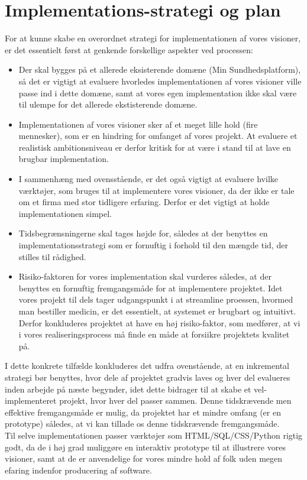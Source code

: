 \section{Implementations-strategi og plan}
For at kunne skabe en overordnet strategi for implementationen af vores visioner, er det essentielt først at genkende forskellige aspekter ved processen:
\begin{itemize}
  \item Der skal bygges på et allerede eksisterende domæne (Min Sundhedsplatform), så det er vigtigt at evaluere hvorledes implementationen af vores visioner ville passe ind
    i dette domæne, samt at vores egen implementation ikke skal være til ulempe for det allerede ekstisterende domæne. 
  \item Implementationen af vores visioner sker af et meget lille hold (fire mennesker), som er en hindring for omfanget af vores projekt. At evaluere et realistisk ambitionsniveau er derfor kritisk for at være i stand til at lave en brugbar implementation. 
  \item I sammenhæng med ovensstående, er det også vigtigt at evaluere hvilke værktøjer, som bruges til at implementere vores visioner, da der ikke er tale om et firma med stor tidligere erfaring. Derfor er det vigtigt at holde implementationen simpel.
  \item Tidsbegrænsningerne skal tages højde for, således at der benyttes en implementationsstrategi som er fornuftig i forhold til den mængde tid, der stilles til rådighed.
  \item Risiko-faktoren for vores implementation skal vurderes således, at der benyttes en fornuftig fremgangsmåde for at implementere projektet. Idet vores projekt til dels tager udgangspunkt i at streamline proessen, hvormed man bestiller medicin, er det essentielt, at systemet er brugbart og intuitivt. Derfor konkluderes projektet at have en høj risiko-faktor, som medfører, at vi i vores realiseringsprocess må finde en måde at forsiikre projektets kvalitet på.
\end{itemize}

I dette konkrete tilfælde konkluderes det udfra ovenstående, at en inkremental strategi bør benyttes, hvor dele af projektet gradvis laves og hver del evalueres inden arbejde på næste begynder, idet dette bidrager til at skabe et vel-implementeret projekt, hvor hver del passer sammen. Denne tidskrævende men effektive fremgangsmåde er mulig, da projektet har et mindre omfang (er en prototype) således, at vi kan tillade os denne tidskrævende fremgangsmåde.\\
Til selve implementationen passer værktøjer som HTML/SQL/CSS/Python rigtig godt, da de i høj grad muliggøre en interaktiv prototype til at illustrere vores visioner, samt at de er anvendelige for vores mindre hold af folk uden megen efaring indenfor producering af software.


